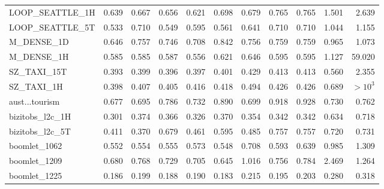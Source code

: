 {\begin{longtable}{@{}p{2.2cm}@{\hspace{6pt}}rrrrrrrrrr@{}}
\ttfamily\scriptsize LOOP\_SEATTLE\_1H & \cellcolor{medalSilver}0.639 & 0.667 & \cellcolor{medalBronze}0.656 & \cellcolor{medalGold}0.621 & 0.698 & 0.679 & 0.765 & 0.765 & 1.501 & 2.639 \\
\ttfamily\scriptsize LOOP\_SEATTLE\_5T & \cellcolor{medalGold}0.533 & 0.710 & \cellcolor{medalSilver}0.549 & 0.595 & \cellcolor{medalBronze}0.561 & 0.641 & 0.710 & 0.710 & 1.044 & 1.155 \\
\ttfamily\scriptsize M\_DENSE\_1D & \cellcolor{medalGold}0.646 & 0.757 & \cellcolor{medalBronze}0.746 & \cellcolor{medalSilver}0.708 & 0.842 & 0.756 & 0.759 & 0.759 & 0.965 & 1.073 \\
\ttfamily\scriptsize M\_DENSE\_1H & \cellcolor{medalBronze}0.585 & \cellcolor{medalSilver}0.585 & 0.587 & \cellcolor{medalGold}0.556 & 0.621 & 0.646 & 0.595 & 0.595 & 1.127 & 59.020 \\
\ttfamily\scriptsize SZ\_TAXI\_15T & \cellcolor{medalGold}0.393 & 0.399 & \cellcolor{medalSilver}0.396 & \cellcolor{medalBronze}0.397 & 0.401 & 0.429 & 0.413 & 0.413 & 0.560 & 2.355 \\
\ttfamily\scriptsize SZ\_TAXI\_1H & \cellcolor{medalGold}0.398 & \cellcolor{medalBronze}0.407 & \cellcolor{medalSilver}0.405 & 0.416 & 0.418 & 0.494 & 0.426 & 0.426 & 0.689 & $>\!10^{3}$ \\
\ttfamily\scriptsize aust...tourism & \cellcolor{medalGold}0.677 & \cellcolor{medalSilver}0.695 & 0.786 & 0.732 & 0.890 & \cellcolor{medalBronze}0.699 & 0.918 & 0.928 & 0.730 & 0.762 \\
\ttfamily\scriptsize bizitobs\_l2c\_1H & \cellcolor{medalGold}0.301 & 0.374 & 0.366 & \cellcolor{medalSilver}0.326 & 0.370 & 0.354 & \cellcolor{medalBronze}0.342 & 0.342 & 0.634 & 0.718 \\
\ttfamily\scriptsize bizitobs\_l2c\_5T & \cellcolor{medalSilver}0.411 & \cellcolor{medalGold}0.370 & 0.679 & \cellcolor{medalBronze}0.461 & 0.595 & 0.485 & 0.757 & 0.757 & 0.720 & 0.731 \\
\ttfamily\scriptsize boomlet\_1062 & \cellcolor{medalSilver}0.552 & \cellcolor{medalBronze}0.554 & 0.555 & 0.573 & \cellcolor{medalGold}0.548 & 0.708 & 0.593 & 0.639 & 0.985 & 1.309 \\
\ttfamily\scriptsize boomlet\_1209 & \cellcolor{medalSilver}0.680 & 0.768 & 0.729 & \cellcolor{medalBronze}0.705 & \cellcolor{medalGold}0.645 & 1.016 & 0.756 & 0.784 & 2.469 & 1.264 \\
\ttfamily\scriptsize boomlet\_1225 & \cellcolor{medalSilver}0.186 & 0.199 & \cellcolor{medalBronze}0.188 & 0.190 & \cellcolor{medalGold}0.183 & 0.215 & 0.195 & 0.203 & 0.280 & 0.318 \\

\end{longtable}}
